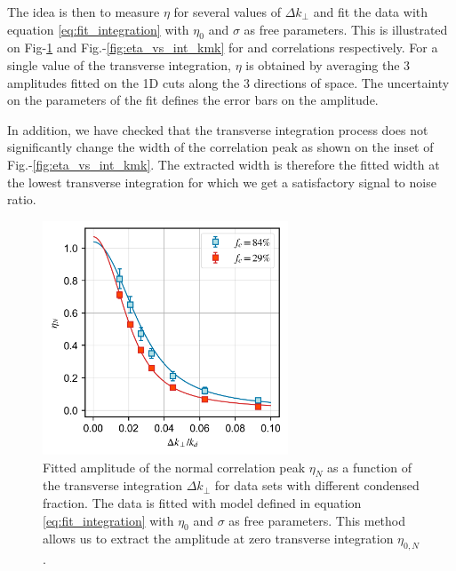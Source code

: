 The idea is then to measure $\eta$ for several values of $\Delta k_{\perp}$ and fit the data with equation \ref{eq:fit_integration} with $\eta_0$ and $\sigma$ as free parameters. This is illustrated on Fig-\ref{fig:integration_kk} and Fig.-\ref{fig:eta_vs_int_kmk} for \kmk and \kk correlations respectively. For a single value of the transverse integration, $\eta$ is obtained by averaging the 3 amplitudes fitted on the 1D cuts along the 3 directions of space. The uncertainty on the parameters of the fit defines the error bars on the amplitude.

In addition, we have checked that the transverse integration process does not significantly change the width of the correlation peak as shown on the inset of Fig.-\ref{fig:eta_vs_int_kmk}. The extracted width is therefore the fitted width at the lowest transverse integration for which we get a satisfactory signal to noise ratio.

\begin{figure}
    \centering
    \includegraphics[width=0.65\textwidth]{Fig/Chapter4/eta_vs_int_kk.png}
    \caption[Fitted amplitude of the normal correlation peak $\eta_N$ as a function of the transverse integration $\Delta k_{\perp}$]{Fitted amplitude of the normal correlation peak $\eta_N$ as a function of the transverse integration $\Delta k_{\perp}$ for data sets with different condensed fraction. The data is fitted with model defined in equation \ref{eq:fit_integration} with $\eta_0$ and $\sigma$ as free parameters. This method allows us to extract the amplitude at zero transverse integration $\eta_{0,N}$.}
    \label{fig:integration_kk}
\end{figure}


